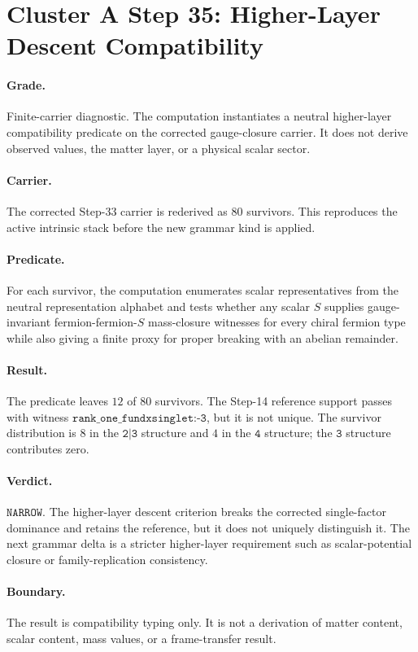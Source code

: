 \section*{Cluster A Step 35: Higher-Layer Descent Compatibility}

\paragraph{Grade.}
Finite-carrier diagnostic. The computation instantiates a neutral higher-layer compatibility predicate on the corrected gauge-closure carrier. It does not derive observed values, the matter layer, or a physical scalar sector.

\paragraph{Carrier.}
The corrected Step-33 carrier is rederived as \(80\) survivors. This reproduces the active intrinsic stack before the new grammar kind is applied.

\paragraph{Predicate.}
For each survivor, the computation enumerates scalar representatives from the neutral representation alphabet and tests whether any scalar \(S\) supplies gauge-invariant fermion-fermion-\(S\) mass-closure witnesses for every chiral fermion type while also giving a finite proxy for proper breaking with an abelian remainder.

\paragraph{Result.}
The predicate leaves \(12\) of \(80\) survivors. The Step-14 reference support passes with witness \(\texttt{rank\_one\_fundxsinglet:-3}\), but it is not unique. The survivor distribution is \(8\) in the \(\texttt{2|3}\) structure and \(4\) in the \(\texttt{4}\) structure; the \(\texttt{3}\) structure contributes zero.

\paragraph{Verdict.}
\(\texttt{NARROW}\). The higher-layer descent criterion breaks the corrected single-factor dominance and retains the reference, but it does not uniquely distinguish it. The next grammar delta is a stricter higher-layer requirement such as scalar-potential closure or family-replication consistency.

\paragraph{Boundary.}
The result is compatibility typing only. It is not a derivation of matter content, scalar content, mass values, or a frame-transfer result.

